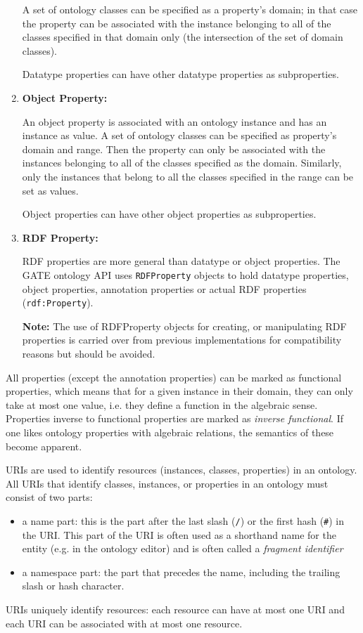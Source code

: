 \begin{enumerate}
A set of ontology classes can be specified as a property's domain; in that case the
property can be associated with the instance belonging to all of the classes
specified in that domain only (the intersection of the set of domain classes).

Datatype properties can have other datatype properties as subproperties.

\item \textbf{Object Property:}

An object property is associated with an ontology instance and has an instance as
value. A set of ontology classes can be specified as property's domain and
range. Then the property can only be associated with the instances belonging to all
of the classes specified as the domain. Similarly, only the instances that
belong to all the classes specified in the range can be set as values. %

Object properties can have other object properties as subproperties.

\item \textbf{RDF Property:}

RDF properties are more general than datatype or object properties. 
The GATE ontology API uses \texttt{RDFProperty} objects to hold
datatype properties, object properties, annotation properties or
actual RDF properties (\texttt{rdf:Property}). 

\textbf{Note:} The use of RDFProperty objects for creating, or manipulating RDF properties is carried over from previous
implementations for compatibility reasons but should be avoided.

\end{enumerate}

All properties (except the annotation properties) can be marked as functional
properties, which means that for a given instance in their domain, they can only
take at most one value, i.e. they define a function in the algebraic sense.
Properties inverse to functional properties are marked as \emph{inverse functional}. If
one likes ontology properties with algebraic relations, the semantics of these
become apparent.



URIs are used to identify resources (instances, classes, properties)
in an ontology. All URIs that identify classes, instances, or 
properties in an ontology must consist of two parts: 
\begin{itemize}
 \item a name part: this is the part after the last slash (\verb!/!) or the
first hash (\verb!#!) in the URI. This part of the URI is often used 
as a shorthand name for the entity (e.g. in the ontology editor)
and is often called a \emph{fragment identifier}
 \item a namespace part: the part that precedes the name, including the
trailing slash or hash character.
\end{itemize}
URIs uniquely identify resources: each resource can have at most one 
URI and each URI can be associated with at most one resource.

